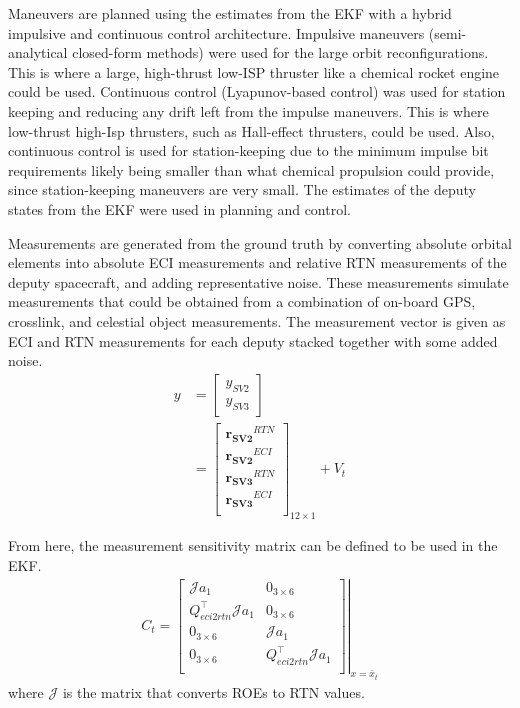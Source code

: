 Maneuvers are planned using the estimates from the EKF with a hybrid impulsive and continuous control architecture. Impulsive maneuvers (semi-analytical closed-form methods) were used for the large orbit reconfigurations. This is where a large, high-thrust low-ISP thruster like a chemical rocket engine could be used. Continuous control (Lyapunov-based control) was used for station keeping and reducing any drift left from the impulse maneuvers. This is where low-thrust high-Isp thrusters, such as Hall-effect thrusters, could be used. Also, continuous control is used for station-keeping due to the minimum impulse bit requirements likely being smaller than what chemical propulsion could provide, since station-keeping maneuvers are very small. The estimates of the deputy states from the EKF were used in planning and control.

Measurements are generated from the ground truth by converting absolute orbital elements into absolute ECI measurements and relative RTN measurements of the deputy spacecraft, and adding representative noise. These measurements simulate measurements that could be obtained from a combination of on-board GPS, crosslink, and celestial object measurements. The measurement vector is given as ECI and RTN measurements for each deputy stacked together with some added noise. 
\begin{align}
    y &= \begin{bmatrix}
        y_{SV2} \\
        y_{SV3}
    \end{bmatrix} \\
    &= \begin{bmatrix}
        \boldsymbol{r_{SV2}}^{RTN}\\
        \boldsymbol{r_{SV2}}^{ECI} \\
        \boldsymbol{r_{SV3}}^{RTN} \\
        \boldsymbol{r_{SV3}}^{ECI} \\
    \end{bmatrix}_{12\times 1} + V_t
\end{align}

From here, the measurement sensitivity matrix can be defined to be used in the EKF.
\begin{align}
    C_t = \left.\begin{bmatrix}
        \mathcal{J}a_1 & 0_{3\times6} \\
         Q^\top_{eci2rtn} \mathcal{J}
a_1 & 0_{3\times6} \\
        0_{3\times6}  & \mathcal{J}a_1 \\
        0_{3\times6} & Q^\top_{eci2rtn} \mathcal{J}
a_1\\
    \end{bmatrix} \right|_{x = \bar{x}_t}
\end{align}
where $\mathcal{J}$ is the matrix that converts ROEs to RTN values. 

